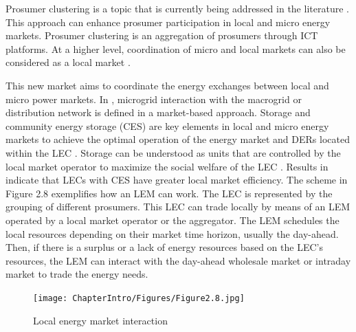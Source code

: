 Prosumer clustering is a topic that is currently being addressed in the literature \cite{doulamis2017virtual, vergados2016prosumer, da2013impact}. This approach can enhance prosumer participation in local and micro energy markets. Prosumer clustering is an aggregation of prosumers through ICT platforms.
At a higher level, coordination of micro and local markets can also be considered as a local market \cite{menniti2014future}.

This new market aims to coordinate the energy exchanges between local and micro power markets. In \cite{zachar2016microgrid}, microgrid interaction with the macrogrid or distribution network is defined in a market-based approach. 
Storage and community energy storage (CES) are key elements in local and micro energy markets to achieve the optimal operation of the energy market and DERs located within the LEC \cite{Olivella2016ENERGYCON, Bayram2014, mengelkamp2017role, Menniti2015, menniti2014management, mediwaththe2017competitive}. Storage can be understood as units that are controlled by the local market operator to maximize the social welfare of the LEC \cite{Olivella2016ENERGYCON}. Results in \cite{mengelkamp2017role} indicate that LECs with CES have greater local market efficiency. 
The scheme in Figure 2.8 exemplifies how an LEM can work. The LEC is represented by the grouping of different prosumers. This LEC can trade locally by means of an LEM operated by a local market operator or the aggregator. The LEM schedules the local resources depending on their market time horizon, usually the day-ahead. Then, if there is a surplus or a lack of energy resources based on the LEC's resources, the LEM can interact with the day-ahead wholesale market or intraday market to trade the energy needs.


\begin{figure}[]
	\centering
	\texttt{[image: ChapterIntro/Figures/Figure2.8.jpg]}
		\caption{Local energy market interaction}  
\end{figure}


